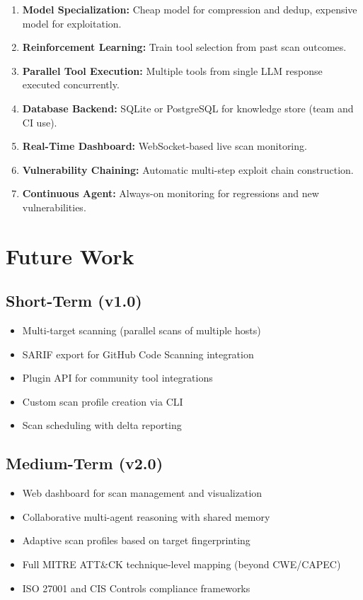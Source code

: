 \documentclass[12pt,a4paper]{report}
\begin{document}
\begin{enumerate}
    \item \textbf{Model Specialization:} Cheap model for compression and dedup, expensive model for exploitation.
    \item \textbf{Reinforcement Learning:} Train tool selection from past scan outcomes.
    \item \textbf{Parallel Tool Execution:} Multiple tools from single LLM response executed concurrently.
    \item \textbf{Database Backend:} SQLite or PostgreSQL for knowledge store (team and CI use).
    \item \textbf{Real-Time Dashboard:} WebSocket-based live scan monitoring.
    \item \textbf{Vulnerability Chaining:} Automatic multi-step exploit chain construction.
    \item \textbf{Continuous Agent:} Always-on monitoring for regressions and new vulnerabilities.
\end{enumerate}


\chapter{Future Work}

\section{Short-Term (v1.0)}

\begin{itemize}
    \item Multi-target scanning (parallel scans of multiple hosts)
    \item SARIF export for GitHub Code Scanning integration
    \item Plugin API for community tool integrations
    \item Custom scan profile creation via CLI
    \item Scan scheduling with delta reporting
\end{itemize}

\section{Medium-Term (v2.0)}

\begin{itemize}
    \item Web dashboard for scan management and visualization
    \item Collaborative multi-agent reasoning with shared memory
    \item Adaptive scan profiles based on target fingerprinting
    \item Full MITRE ATT\&CK technique-level mapping (beyond CWE/CAPEC)
    \item ISO 27001 and CIS Controls compliance frameworks
\end{itemize}
\end{document}
